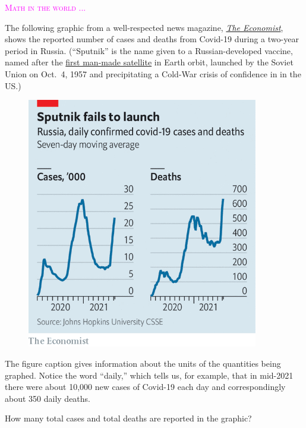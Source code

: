 \documentclass[
  letterpaper,
  DIV=11,
  numbers=noendperiod,
  oneside]{scrreprt}
\newenvironment{intheworld}%
{%
\textcolor{magenta}{\hrulefill}%
  \par\vspace{.3\baselineskip}%
  \textcolor{magenta}{\scshape Math in the world ...}%
  \par\vspace{\baselineskip}%
}%
{\textcolor{magenta}{\hrulefill}}
\begin{document}
\begin{intheworld}
The following graphic from a well-respected news magazine,
\emph{\href{https://www.economist.com/img/b/600/653/90/sites/default/files/images/print-edition/20210710_EUC776.png}{The
Economist}}, shows the reported number of cases and deaths from Covid-19
during a two-year period in Russia. (``Sputnik'' is the name given to a
Russian-developed vaccine, named after the
\href{https://en.wikipedia.org/wiki/Sputnik_1}{first man-made satellite}
in Earth orbit, launched by the Soviet Union on Oct.~4, 1957 and
precipitating a Cold-War crisis of confidence in in the US.)

\begin{figure}

{\centering \includegraphics[width=0.9\textwidth,height=\textheight]{Accumulation/www/sputnik.png}

}

\end{figure}

The figure caption gives information about the units of the quantities
being graphed. Notice the word ``daily,'' which tells us, for example,
that in mid-2021 there were about 10,000 new cases of Covid-19 each day
and correspondingly about 350 daily deaths.

How many total cases and total deaths are reported in the graphic?


\end{intheworld}
\end{document}
